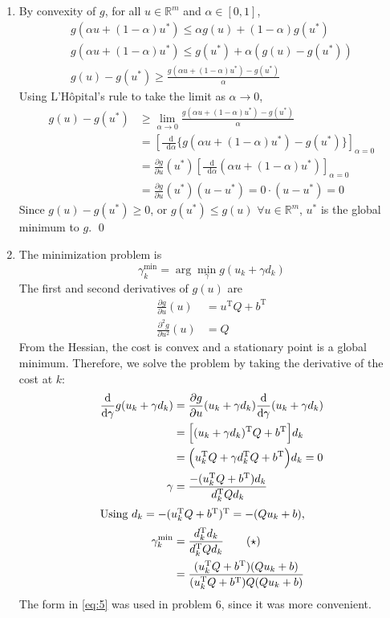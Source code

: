 \documentclass[letterpaper,12pt,titlepage]{article}
\newcommand*\dif{\mathop{}\!\mathrm{d}}
\newcommand{\trans}{^\text{T}}
\newcommand*\pder[2]{\frac{\partial #1}{\partial #2}}
\newcommand*\R{\mathbb{R}}
\begin{document}
\begin{enumerate}[leftmargin=0pt]
\item By convexity of $g$, for all $u\in\R^m$ and $\alpha\in[0,1]$,
  \begin{gather}
    g(\alpha u + (1-\alpha)u^*) \le \alpha g(u) + (1-\alpha)g(u^*) \\
    g(\alpha u + (1-\alpha)u^*) \le g(u^*) + \alpha (g(u)-g(u^*)) \\
    g(u)-g(u^*) \ge \frac{g(\alpha u + (1-\alpha)u^*) - g(u^*)}{\alpha}
  \end{gather}
  Using L'H\^opital's rule to take the limit as $\alpha\to0$,
  \begin{align}
    g(u)-g(u^*) &\ge \lim_{\alpha\to0} \frac{g(\alpha u + (1-\alpha)u^*) - g(u^*)}{\alpha} \\
                &= \left[ \frac{\dif}{\dif\alpha} \Big\{ g(\alpha u + (1-\alpha)u^*) - g(u^*) \Big\} \right]_{\alpha=0} \\
                &= \pder{g}{u}(u^*) \left[ \frac{\dif}{\dif\alpha} (\alpha u + (1-\alpha)u^*) \right]_{\alpha=0} \\
                &= \pder{g}{u}(u^*) (u - u^*) = 0\cdot(u-u^*) = 0
  \end{align}
  Since $g(u)-g(u^*)\ge0$, or $g(u^*)\le g(u)$ $\forall u\in\R^m$, $u^*$ is the global minimum to $g$. \qed

\item The minimization problem is
  \[ \gamma_k^{\min} = \arg\min_\gamma g(u_k+\gamma d_k) \]
  The first and second derivatives of $g(u)$ are
  \begin{align}
    \pder{g}{u}(u) &= u\trans Q + b\trans \\
    \pder{^2 g}{u^2}(u) &= Q
  \end{align}
  From the Hessian, the cost is convex and a stationary point is a global minimum. Therefore, we solve the problem by taking the derivative of the cost at $k$:
  \begin{align}
    \frac{\dif}{\dif\gamma} g(u_k+\gamma d_k) &= \pder{g}{u}(u_k+\gamma d_k) \frac{\dif}{\dif\gamma}(u_k+\gamma d_k) \\
                                              &= \Big[(u_k+\gamma d_k)\trans Q + b\trans\Big] d_k \\
                                              &= \Big(u_k\trans Q + \gamma d_k\trans Q + b\trans\Big) d_k = 0 \\
    \gamma &= \frac{-(u_k\trans Q + b\trans) d_k}{d_k\trans Q d_k} \\
    \shortintertext{Using $d_k=-(u_k\trans Q+b\trans)\trans=-(Qu_k+b)$,}
    \gamma_k^{\min} &= \frac{d_k\trans d_k}{d_k\trans Q d_k} \label{eq:5}\tag{$\star$} \\
                                              &= \frac{(u_k\trans Q+b\trans)(Qu_k+b)}{(u_k\trans Q+b\trans)Q(Qu_k+b)}
  \end{align}
  The form in \eqref{eq:5} was used in problem 6, since it was more convenient.


\end{enumerate}
\end{document}
